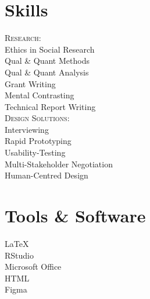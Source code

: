 \documentclass{rmjCV}
\begin{document}
\begin{paracol}{2}
\begin{leftcolumn}
	\section{Skills}
\noindent \textsc{Research:}\\
Ethics in Social Research\\
Qual \& Quant Methods\\
Qual \& Quant Analysis\\
Grant Writing\\
Mental Contrasting\\
Technical Report Writing\\
	
\noindent \textsc{Design Solutions:}\\
Interviewing\\
Rapid Prototyping\\
Usability-Testing\\
Multi-Stakeholder Negotiation\\
Human-Centred Design

	\section{Tools \& Software}
LaTeX\\
RStudio\\
Microsoft Office\\
HTML\\
Figma\\



	
	
\end{leftcolumn}



\end{paracol}
\end{document}
